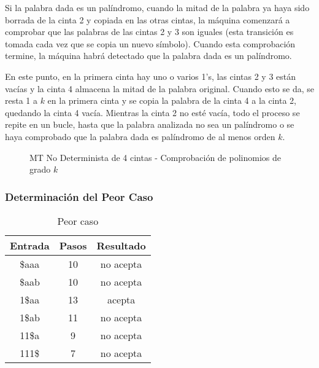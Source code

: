 \documentclass{uc3mpracticas}
\begin{document}
\vspace{1mm}

Si la palabra dada es un palíndromo, cuando la mitad de la palabra ya haya sido borrada de la cinta 2 y copiada en las otras cintas, la máquina comenzará a comprobar que las palabras de las cintas 2 y 3 son iguales (esta transición es tomada cada vez que se copia un nuevo símbolo). Cuando esta comprobación termine, la máquina habrá detectado que la palabra dada es un palíndromo.

\vspace{2mm}

En este punto, en la primera cinta hay uno o varios 1’s, las cintas 2 y 3 están vacías y la cinta 4 almacena la mitad de la palabra original. Cuando esto se da, se resta 1 a $k$ en la primera cinta y se copia la palabra de la cinta 4 a la cinta 2, quedando la cinta 4 vacía. Mientras la cinta 2 no esté vacía, todo el proceso se repite en un bucle, hasta que la palabra analizada no sea un palíndromo o se haya comprobado que la palabra dada es palíndromo de al menos orden $k$.


\begin{figure}[!h]
  \caption{MT No Determinista de 4 cintas - Comprobación de polinomios de grado $k$}
\end{figure}


\subsubsection{Determinación del Peor Caso}

  \begin{table}[!h]
    \centering
  \begin{tabular}{|c|c|c|}
  \hline
  \textbf{Entrada} & \textbf{Pasos} & \textbf{Resultado} \\ \hline
  \$aaa   & 10             & no acepta          \\ \hline
  \$aab   & 10             & no acepta          \\ \hline
  1\$aa   & 13             & acepta             \\ \hline
  1\$ab            & 11             & no acepta          \\ \hline
  11\$a            & 9              & no acepta          \\ \hline
  111\$            & 7              & no acepta          \\ \hline
  \end{tabular}
  \caption{Peor caso}
  \end{table}
\end{document}
